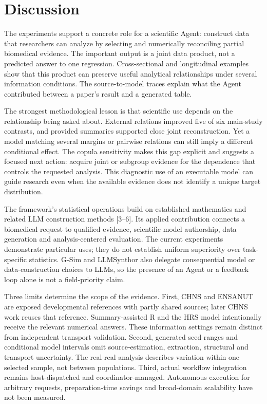 \documentclass[10pt,twocolumn]{article}
\begin{document}
\section{Discussion}

The experiments support a concrete role for a scientific Agent: construct data that researchers can analyze by selecting and numerically reconciling partial biomedical evidence. The important output is a joint data product, not a predicted answer to one regression. Cross-sectional and longitudinal examples show that this product can preserve useful analytical relationships under several information conditions. The source-to-model traces explain what the Agent contributed between a paper's result and a generated table.


The strongest methodological lesson is that scientific use depends on the relationship being asked about. External relations improved five of six main-study contrasts, and provided summaries supported close joint reconstruction. Yet a model matching several margins or pairwise relations can still imply a different conditional effect. The copula sensitivity makes this gap explicit and suggests a focused next action: acquire joint or subgroup evidence for the dependence that controls the requested analysis. This diagnostic use of an executable model can guide research even when the available evidence does not identify a unique target distribution.


The framework's statistical operations build on established mathematics and related LLM construction methods [3–6]. Its applied contribution connects a biomedical request to qualified evidence, scientific model authorship, data generation and analysis-centered evaluation. The current experiments demonstrate particular uses; they do not establish uniform superiority over task-specific statistics. G-Sim and LLMSynthor also delegate consequential model or data-construction choices to LLMs, so the presence of an Agent or a feedback loop alone is not a field-priority claim.


Three limits determine the scope of the evidence. First, CHNS and ENSANUT are exposed developmental references with partly shared sources; later CHNS work reuses that reference. Summary-assisted R and the HRS model intentionally receive the relevant numerical answers. These information settings remain distinct from independent transport validation. Second, generated seed ranges and conditional model intervals omit source-estimation, extraction, structural and transport uncertainty. The real-real analysis describes variation within one selected sample, not between populations. Third, actual workflow integration remains host-dispatched and coordinator-managed. Autonomous execution for arbitrary requests, preparation-time savings and broad-domain scalability have not been measured.
\end{document}
